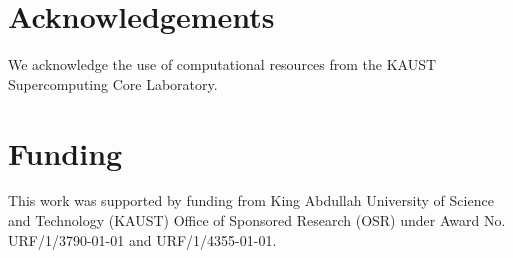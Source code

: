 \documentclass{bioinfo}
\begin{document}




%
%







\section*{Acknowledgements}
We acknowledge the use of computational resources from the 
KAUST Supercomputing Core Laboratory.

\section*{Funding}

This work was supported by funding from King Abdullah University of
Science and Technology (KAUST) Office of Sponsored Research (OSR)
under Award No. URF/1/3790-01-01 and URF/1/4355-01-01.

%
%
%
%
%
%
%
%

\end{document}
